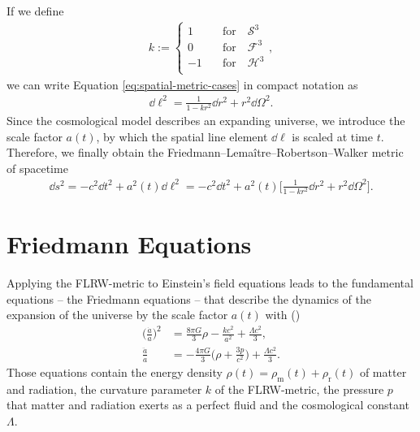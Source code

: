 If we define 
\begin{align}
    k := \begin{cases}
            1 \quad &\text{for} \quad \mathcal{S}^{3} \\
            0 \quad &\text{for} \quad \mathcal{F}^{3} \\
            -1 \quad &\text{for} \quad \mathcal{H}^{3} \\
         \end{cases}, 
\end{align}
we can write Equation \eqref{eq:spatial-metric-cases} in compact notation as 
\begin{align}
    \dd{\ell}^2 = \frac{1}{1 - k r^2} \dd{r}^2 + r^2 \dd{\Omega}^2. 
\end{align}
Since the cosmological model describes an expanding universe, we introduce the scale factor $a(t)$, by which the spatial line element $\dd{\ell}$ is scaled at time $t$. \\
Therefore, we finally obtain the Friedmann--Lemaître--Robertson--Walker metric of spacetime
\begin{align}
    \dd{s}^2 = - c^2 \dd{t}^2 + a^2(t) \dd{\ell}^2 = - c^2 \dd{t}^2 + a^2(t) \biggl[\frac{1}{1 - k r^2} \dd{r}^2 + r^2 \dd{\Omega}^2 \biggr]. \label{eq:FLRW-metric}
\end{align}



\section{Friedmann Equations}

Applying the FLRW-metric to Einstein's field equations leads to the fundamental equations -- the Friedmann equations -- that describe the dynamics of the expansion of the universe by the scale factor $a(t)$ with (\cite[p.~11]{Bartelmann2019})
\begin{align}
    \biggl(\frac{\dot{a}}{a}\biggr)^2 &= \frac{8\pi G}{3} \rho - \frac{k c^2}{a^2} + \frac{\Lambda c^2}{3} , \label{eq:friedmann1} \\
    \frac{\ddot{a}}{a} &= -\frac{4\pi G}{3}\biggl( \rho + \frac{3p}{c^2}\biggr) + \frac{\Lambda c^2}{3} \label{eq:friedmann2}.
\end{align}
Those equations contain the energy density $\rho(t) = \rho_{\text{m}}(t) + \rho_{\text{r}}(t)$ of matter and radiation, the curvature parameter $k$ of the FLRW-metric, the pressure $p$ that matter and radiation exerts as a perfect fluid and the cosmological constant $\Lambda$. \\

